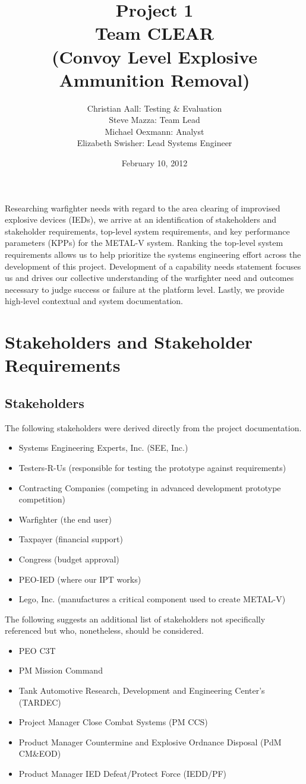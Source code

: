 \documentclass[letterpaper,10pt]{article}
\title{Project 1 \\ \Large Team CLEAR \\ \normalsize (Convoy Level Explosive Ammunition Removal)}
\author{Christian Aall: Testing \& Evaluation \\ 
	Steve Mazza: Team Lead \\ 
	Michael Oexmann: Analyst \\ 
	Elizabeth Swisher: Lead Systems Engineer}
\date{February 10, 2012}
\begin{document}
\maketitle

Researching warfighter needs with regard to the area clearing of improvised explosive devices (IEDs), we arrive at an identification of stakeholders and stakeholder requirements, top-level system requirements, and key performance parameters (KPPs) for the METAL-V system.  Ranking the top-level system requirements allows us to help prioritize the systems engineering effort across the development of this project.  Development of a capability needs statement focuses us and drives our collective understanding of the warfighter need and outcomes necessary to judge success or failure at the platform level.  Lastly, we provide high-level contextual and system documentation.

\section{Stakeholders and Stakeholder Requirements}
\subsection{Stakeholders}
The following stakeholders were derived directly from the project documentation.
\begin{itemize}
	\item Systems Engineering Experts, Inc. (SEE, Inc.)
	\item Testers-R-Us (responsible for testing the prototype against requirements)
	\item Contracting Companies (competing in advanced development prototype competition)
	\item Warfighter (the end user)
	\item Taxpayer (financial support)
	\item Congress (budget approval)
	\item PEO-IED (where our IPT works)
	\item Lego, Inc. (manufactures a critical component used to create METAL-V)
\end{itemize}
The following suggests an additional list of stakeholders not specifically referenced but who, nonetheless, should be considered.
\begin{itemize}
	\item PEO C3T
	\item PM Mission Command
	\item Tank Automotive Research, Development and Engineering Center's (TARDEC)
	\item Project Manager Close Combat Systems (PM CCS)
	\item Product Manager Countermine and Explosive Ordnance Disposal (PdM CM\&EOD)
	\item Product Manager IED Defeat/Protect Force (IEDD/PF)
\end{itemize}
\end{document}
